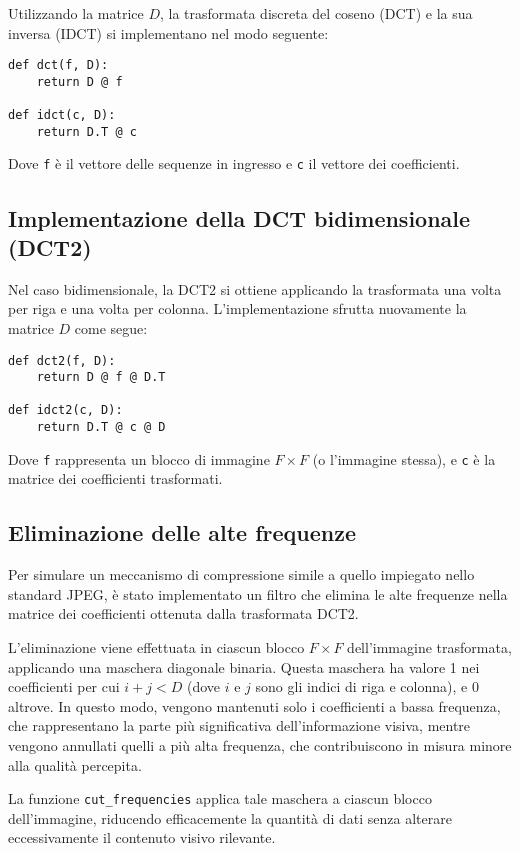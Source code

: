 Utilizzando la matrice $D$, la trasformata discreta del coseno (DCT) e la sua inversa (IDCT) si implementano nel modo seguente:

\begin{verbatim}
def dct(f, D):
    return D @ f

def idct(c, D):
    return D.T @ c
\end{verbatim}

Dove \texttt{f} è il vettore delle sequenze in ingresso e \texttt{c} il vettore dei coefficienti.

\subsection{Implementazione della DCT bidimensionale (DCT2)}

Nel caso bidimensionale, la DCT2 si ottiene applicando la trasformata una volta per riga e una volta per colonna. L'implementazione sfrutta nuovamente la matrice $D$ come segue:

\begin{verbatim}
def dct2(f, D):
    return D @ f @ D.T

def idct2(c, D):
    return D.T @ c @ D
\end{verbatim}

Dove \texttt{f} rappresenta un blocco di immagine $F \times F$ (o l'immagine stessa), e \texttt{c} è la matrice dei coefficienti trasformati.

\subsection{Eliminazione delle alte frequenze}

Per simulare un meccanismo di compressione simile a quello impiegato nello standard JPEG, è stato implementato un filtro che elimina le alte frequenze nella matrice dei coefficienti ottenuta dalla trasformata DCT2. 

L'eliminazione viene effettuata in ciascun blocco $F \times F$ dell'immagine trasformata, applicando una maschera diagonale binaria. Questa maschera ha valore 1 nei coefficienti per cui $i + j < D$ (dove $i$ e $j$ sono gli indici di riga e colonna), e 0 altrove. In questo modo, vengono mantenuti solo i coefficienti a bassa frequenza, che rappresentano la parte più significativa dell'informazione visiva, mentre vengono annullati quelli a più alta frequenza, che contribuiscono in misura minore alla qualità percepita.

La funzione \texttt{cut\_frequencies} applica tale maschera a ciascun blocco dell'immagine, riducendo efficacemente la quantità di dati senza alterare eccessivamente il contenuto visivo rilevante.
